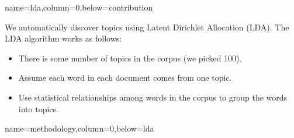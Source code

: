 \documentclass[landscape,final]{baposter}
\begin{document}
\begin{poster}
    \newcommand{\colouredcircle}[1]{%
      \tikz{\useasboundingbox (-0.2em,-0.32em) rectangle(0.2em,0.32em); \draw[draw=black,fill=baposterBGone!80!black!#1!white,line width=0.03em] (0,0) circle(0.18em);}}


  {name=lda,column=0,below=contribution}{

	  We automatically discover topics using Latent Dirichlet Allocation (LDA).
	  The LDA algorithm works as follows:
	  \begin{itemize}
		\item There is some number of topics in the corpus (we picked 100).
		\item Assume each word in each document comes from one topic.
		\item Use statistical relationships among words in the corpus to group 
		  the words into topics.
	  \end{itemize}

  }
  {name=methodology,column=0,below=lda}{

}
\end{poster}
\end{document}
